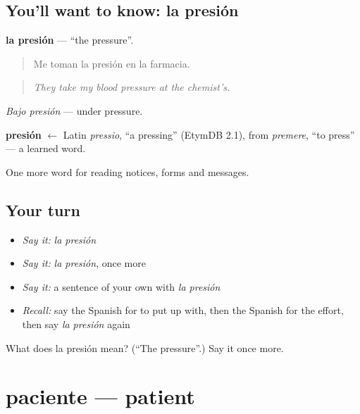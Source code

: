 \subsection*{You'll want to know: la presión}
\textbf{la presión} — \textquotedblleft{}the pressure\textquotedblright{}.

\begin{quote}
Me toman la presión en la farmacia.
\end{quote}

\begin{quote}
\emph{They take my blood pressure at the chemist's.}
\end{quote}

\emph{Bajo presión} — under pressure.

\begin{cousinweb}
\textbf{presión} $\leftarrow$ Latin \emph{pressio}, \textquotedblleft{}a pressing\textquotedblright{} (EtymDB 2.1), from \emph{premere}, \textquotedblleft{}to press\textquotedblright{} — a learned word.
\end{cousinweb}

\begin{grammarlens}[title={What you've built}]
One more word for reading notices, forms and messages.
\end{grammarlens}

\subsection*{Your turn}
\begin{itemize}
\raggedright
  \item \emph{Say it:} \emph{la presión}
  \item \emph{Say it:} \emph{la presión}, once more
  \item \emph{Say it:} a sentence of your own with \emph{la presión}
  \item \emph{Recall:} say the Spanish for to put up with, then the Spanish for the effort, then say \emph{la presión} again
\end{itemize}

\begin{tcolorbox}[breakable,colback=teal!4,colframe=teal!35!black,title={Before you move on}]
What does la presión mean? (\textquotedblleft{}The pressure\textquotedblright{}.) Say it once more.
\end{tcolorbox}
\section[paciente]{paciente — patient}

